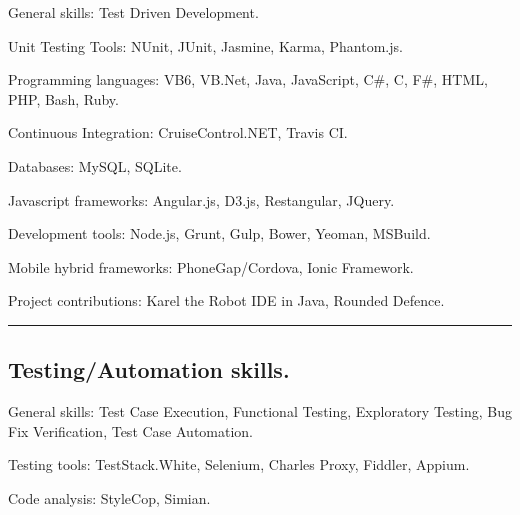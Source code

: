 \documentclass[10pt,letterpaper]{article}
\newenvironment{indentsection}[1]%
{\begin{list}{}%
	{\setlength{\leftmargin}{#1}}%
	\item[]%
}
{\end{list}}
\begin{document}
\begin{indentsection}{\parindent}
\begin{description*}
	\item[General skills:]
	Test Driven Development.
	
	\item[Unit Testing Tools:]
	NUnit,
	JUnit,
	Jasmine,
    Karma,
    Phantom.js.
	
	\item[Programming languages:]
	VB6,
	VB.Net,
	Java,
	JavaScript,
	C\#,
	C,
	F\#,
	HTML,
	PHP,
    Bash,
	Ruby. 
	
	\item[Continuous Integration:]
	CruiseControl.NET,
    Travis CI. 
	
	\item[Databases:]
	MySQL,
    SQLite.
	
	\item[Javascript frameworks:]
	Angular.js,
    D3.js,
    Restangular,
    JQuery.
    
    \item[Development tools:]
	Node.js,
    Grunt,
    Gulp,
    Bower,
    Yeoman,
    MSBuild.
    
    \item[Mobile hybrid frameworks:]
    PhoneGap/Cordova,
    Ionic Framework.
	
	\item[Project contributions:]
	Karel the Robot IDE in Java,
    Rounded Defence.
	
\end{description*}
\end{indentsection}

\hrule
\vspace{-0.4em}
\subsection*{Testing/Automation skills.}

\begin{indentsection}{\parindent}
\begin{description*}

    \item[General skills:]
    Test Case Execution,
    Functional Testing,
    Exploratory Testing,
    Bug Fix Verification,
    Test Case Automation.
	
	\item[Testing tools:]
	TestStack.White,
	Selenium,
    Charles Proxy,
    Fiddler,
    Appium.
	
	\item[Code analysis:]
	StyleCop,
	Simian. 
\end{description*}
\end{indentsection}
\end{document}
